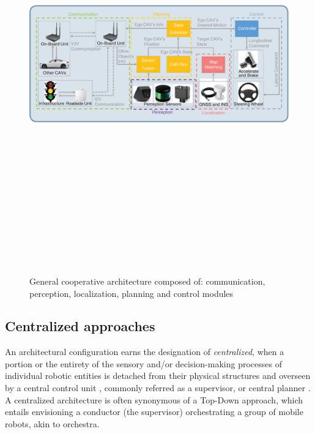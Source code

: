 \begin{figure}[!h]
        \centering 
        \includegraphics[width=12cm,height=18cm,keepaspectratio]{chapters/Chapitre_3/Figures/Architecture.png}
        \caption{General cooperative architecture composed of: communication, perception, localization, planning and control modules \cite{wang2019survey}}
        \label{fig:MVS_architecture}
        \end{figure}

\subsection{Centralized approaches} \label{sec:CentralizedArchitecture}
An architectural configuration earns the designation of \textit{centralized}, when a portion or the entirety of the sensory and/or decision-making processes of individual robotic entities is detached from their physical structures and overseen by a central control unit \cite{diaz2016centralized}\cite{zhou2017stochastic}, commonly referred as a supervisor, or central planner \cite{adouane2016autonomous}. A centralized architecture is often synonymous of a Top-Down approach, which entails envisioning a conductor (the supervisor) orchestrating a group of mobile robots, akin to orchestra. 

